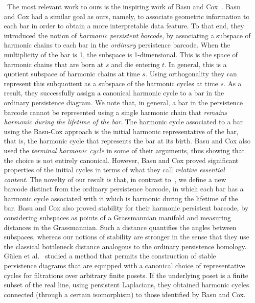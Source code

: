 ~The most relevant work to ours is the inspiring work of Basu and Cox~\cite{BasuCox2022}. %
Basu and Cox had a similar goal as ours, namely, to associate geometric information to each bar in order to obtain a more interpretable data feature. To that end, they introduced the notion of \emph{harmonic persistent barcode}, by associating a subspace of harmonic chains to each bar in the \textit{ordinary} persistence barcode. When the multiplicity of the bar is 1, the subspace is 1-dimensional. %
This is the space of harmonic chains that are born at $s$ and die entering $t$. In general, this is a quotient subspace of harmonic chains at time $s$. Using orthogonality %
they can represent this subquotient as a subspace of the harmonic cycles at time $s$. As a result, they successfully assign a canonical harmonic cycle to a bar in the ordinary persistence diagram. We note that, in general, a bar in the persistence barcode cannot be represented using a single harmonic chain that \textit{remains harmonic during the lifetime of the bar}. The harmonic cycle associated to a bar using the Basu-Cox approach is the initial harmonic representative of the bar, that is, the harmonic cycle that represents the bar at its birth. Basu and Cox also used the \emph{terminal harmonic cycle} in some of their arguments, thus showing that the choice is not entirely canonical. However, Basu and Cox proved significant properties of the initial cycles in terms of what they call \emph{relative essential content}. The novelty of our result is that, in contrast to~\cite{BasuCox2022}, we define a new barcode distinct from the ordinary persistence barcode, in which each bar has a harmonic cycle associated with it which is harmonic during the lifetime of the bar. 
Basu and Cox also proved stability for their harmonic persistent barcode, by considering subspaces as points of a Grassmannian manifold and measuring distances in the Grassmannian. Such a distance quantifies the angles between subspaces, whereas our notions of stability are stronger in the sense that they use the classical bottleneck distance analogous to the ordinary persistence homology.
G\"{u}len et al.~\cite{GulenMemoliWan2024} studied a method that permits the construction of stable persistence diagrams that are equipped with a canonical choice of representative cycles for filtrations over arbitrary finite posets. If the underlying poset is a finite subset of the real line, using persistent Laplacians, they obtained harmonic cycles connected (through a certain isomorphism) to those identified by Basu and Cox. 








